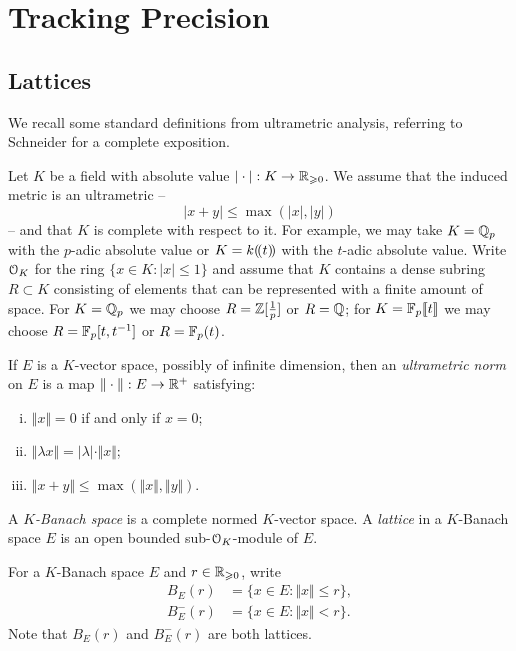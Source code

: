 \documentclass{lms}
\begin{document}

\section{Tracking Precision} \label{sec:prec-proposal}

\subsection{Lattices}

We recall some standard definitions from ultrametric analysis, referring to
Schneider \cite{schneider:11a} for a complete exposition.

Let $K$ be a field with absolute value $|\cdot| : K \to \mathbb R_{\geqslant 0}$. 
We assume that the induced metric is an ultrametric -- 
\[ \lvert x + y \rvert \leq \max(\lvert x \rvert, \lvert y \rvert) \]
-- and that $K$ is complete with respect to it.
For example, we may take $K = \mathbb Q_p$ with the
$p$-adic absolute value or $K = k(\!( t )\!)$ with the $t$-adic absolute value.
Write $\OK$ for the ring $\{x \in K : \lvert x \rvert \le 1\}$ and assume
that $K$ contains a dense subring $R \subset K$
consisting of elements that can be represented with a finite amount of space.
For $K = \mathbb Q_p$ we may choose $R = \mathbb Z[\frac1p]$ or $R = \mathbb Q$;
for $K = \mathbb{F}_p\llbracket t \rrbracket$ we may choose $R = \mathbb{F}_p[t, t^{-1}]$ or $R = \mathbb{F}_p(t)$.

If $E$ is a $K$-vector space, possibly of infinite dimension, then an
\emph{ultrametric norm} on $E$ is a map $\Vert\cdot\Vert : E \to \mathbb R^+$ satisfying:
\begin{enumerate}[(i)]
\item $\Vert x\Vert = 0$ if and only if $x = 0$;
\item $\Vert \lambda x\Vert = |\lambda| \cdot \Vert x\Vert$;
\item $\Vert x+y\Vert \leq \max(\Vert x\Vert, \Vert y\Vert)$.
\end{enumerate}
A \emph{$K$-Banach space} is a complete normed $K$-vector space.
A \emph{lattice} in a $K$-Banach space $E$ is an open bounded sub-$\OK$-module of $E$.

For a $K$-Banach space $E$ and $r \in \mathbb R_{\geqslant 0}$, write
\begin{align*}
B_E(r) &= \{ x \in E : \Vert x \Vert \le r \}, \\
B^-_E(r) &= \{ x \in E : \Vert x \Vert < r\}.
\end{align*}
Note that $B_E(r)$ and $B^-_E(r)$ are both lattices.
\end{document}
